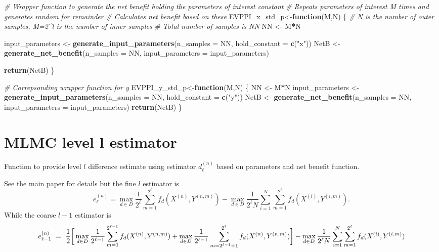 \documentclass[
]{article}
\newenvironment{Shaded}{\begin{snugshade}}{\end{snugshade}}
\newcommand{\CommentTok}[1]{\textcolor[rgb]{0.56,0.35,0.01}{\textit{#1}}}
\newcommand{\ControlFlowTok}[1]{\textcolor[rgb]{0.13,0.29,0.53}{\textbf{#1}}}
\newcommand{\DataTypeTok}[1]{\textcolor[rgb]{0.13,0.29,0.53}{#1}}
\newcommand{\KeywordTok}[1]{\textcolor[rgb]{0.13,0.29,0.53}{\textbf{#1}}}
\newcommand{\NormalTok}[1]{#1}
\newcommand{\OperatorTok}[1]{\textcolor[rgb]{0.81,0.36,0.00}{\textbf{#1}}}
\newcommand{\StringTok}[1]{\textcolor[rgb]{0.31,0.60,0.02}{#1}}
\begin{document}
\begin{Shaded}
\begin{Highlighting}[]
\CommentTok{# Wrapper function to generate the net benefit holding the parameters of interest constant}
\CommentTok{# Repeats parameters of interest M times and generates random for remainder}
\CommentTok{# Calculates net benefit based on these}
\NormalTok{EVPPI_x_std_p<-}\ControlFlowTok{function}\NormalTok{(M,N)}
\NormalTok{\{}
  \CommentTok{# N is the number of outer samples, M=2^l is the number of inner samples}
  \CommentTok{# Total number of samples is NN}
\NormalTok{  NN <-}\StringTok{ }\NormalTok{M}\OperatorTok{*}\NormalTok{N}
  
\NormalTok{  input_parameters <-}\StringTok{ }\KeywordTok{generate_input_parameters}\NormalTok{(}\DataTypeTok{n_samples =}\NormalTok{ NN, }\DataTypeTok{hold_constant =} \KeywordTok{c}\NormalTok{(}\StringTok{"x"}\NormalTok{))}
\NormalTok{  NetB <-}\StringTok{ }\KeywordTok{generate_net_benefit}\NormalTok{(}\DataTypeTok{n_samples =}\NormalTok{ NN, }\DataTypeTok{input_parameters =}\NormalTok{ input_parameters)}
  
  \KeywordTok{return}\NormalTok{(NetB)}
\NormalTok{\}}

\CommentTok{# Correpsonding wrapper function for y}
\NormalTok{EVPPI_y_std_p<-}\ControlFlowTok{function}\NormalTok{(M,N)}
\NormalTok{\{}
\NormalTok{  NN <-}\StringTok{ }\NormalTok{M}\OperatorTok{*}\NormalTok{N}
\NormalTok{  input_parameters <-}\StringTok{ }\KeywordTok{generate_input_parameters}\NormalTok{(}\DataTypeTok{n_samples =}\NormalTok{ NN, }\DataTypeTok{hold_constant =} \KeywordTok{c}\NormalTok{(}\StringTok{"y"}\NormalTok{))}
\NormalTok{  NetB <-}\StringTok{ }\KeywordTok{generate_net_benefit}\NormalTok{(}\DataTypeTok{n_samples =}\NormalTok{ NN, }\DataTypeTok{input_parameters =}\NormalTok{ input_parameters)}
  \KeywordTok{return}\NormalTok{(NetB)}
\NormalTok{\}}
\end{Highlighting}
\end{Shaded}

\hypertarget{mlmc-level-l-estimator}{%
\section{MLMC level l estimator}\label{mlmc-level-l-estimator}}

Function to provide level \(l\) difference estimate using estimator
\(d_\ell^{(n)}\) based on parameters and net benefit function.

See the main paper for details but the fine \(l\) estimator is \[
e_{\ell}^{(n)} = \max_{d\in D}\frac{1}{2^\ell}\sum_{m=1}^{2^\ell}f_d(X^{(n)},Y^{(n,m)}) - \max_{d\in D}\frac{1}{2^\ell N}\sum_{i=1}^{N}\sum_{m=1}^{2^\ell}f_d(X^{(i)},Y^{(i,m)}).
\] While the coarse \(l-1\) estimator is \[
e_{\ell-1}^{(n)}\ = \  \frac{1}{2}\bigg[\max_{d\in D}\frac{1}{2^{\ell-1}} \sum_{m=1}^{2^{\ell-1}} f_d(X^{(n)},Y^{(n,m)})
+ \max_{d\in D}\frac{1}{2^{\ell-1}} \sum_{m=2^{\ell-1}+1}^{2^\ell}f_d(X^{(n)},Y^{(n,m)}) \bigg]\\
 - \max_{d\in D}\frac{1}{2^\ell N}\sum_{i=1}^{N}\sum_{m=1}^{2^\ell}f_d(X^{(i)},Y^{(i,m)})
\]
\end{document}

